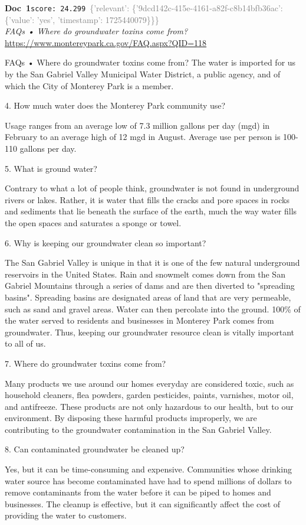 \documentclass[a4paper,11pt]{article}
\begin{document}
\begin{docenv}
{\footnotesize\textcolor{doccolor}{\textbf{Doc~1}}}\hfill{\tiny\texttt{score:~24.299}}\ {\tiny\textcolor{gray}{\{'relevant': \{'9dcd142c-415e-4161-a82f-c8b14bfb36ac': \{'value': 'yes', 'timestamp': 1725440079\}\}\}}}\\[3pt]
{\small\textit{FAQs • Where do groundwater toxins come from?}}\\[2pt]
{\tiny\url{https://www.montereypark.ca.gov/FAQ.aspx?QID=118}}\\[4pt]
{\footnotesize FAQs • Where do groundwater toxins come from?
The water is imported for us by the San Gabriel Valley Municipal Water District, a public agency, and of which the City of Monterey Park is a member.	

4.
How much water does the Monterey Park community use?

Usage ranges from an average low of 7.3 million gallons per day (mgd) in February to an average high of 12 mgd in August. Average use per person is 100-110 gallons per day.	

5.
What is ground water?

Contrary to what a lot of people think, groundwater is not found in underground rivers or lakes. Rather, it is water that fills the cracks and pore spaces in rocks and sediments that lie beneath the surface of the earth, much the way water fills the open spaces and saturates a sponge or towel. 	

6.
Why is keeping our groundwater clean so important?

The San Gabriel Valley is unique in that it is one of the few natural underground reservoirs in the United States. Rain and snowmelt comes down from the San Gabriel Mountains through a series of dams and are then diverted to "spreading basins". Spreading basins are designated areas of land that are very permeable, such as sand and gravel areas. Water can then percolate into the ground. 100\% of the water served to residents and businesses in Monterey Park comes from groundwater. Thus, keeping our groundwater resource clean is vitally important to all of us. 	

7.
Where do groundwater toxins come from?

Many products we use around our homes everyday are considered toxic, such as household cleaners, flea powders, garden pesticides, paints, varnishes, motor oil, and antifreeze. These products are not only hazardous to our health, but to our environment. By disposing these harmful products improperly, we are contributing to the groundwater contamination in the San Gabriel Valley.	

8.
Can contaminated groundwater be cleaned up?

Yes, but it can be time-consuming and expensive. Communities whose drinking water source has become contaminated have had to spend millions of dollars to remove contaminants from the water before it can be piped to homes and businesses. The cleanup is effective, but it can significantly affect the cost of providing the water to customers.}
\end{docenv}
\end{document}
